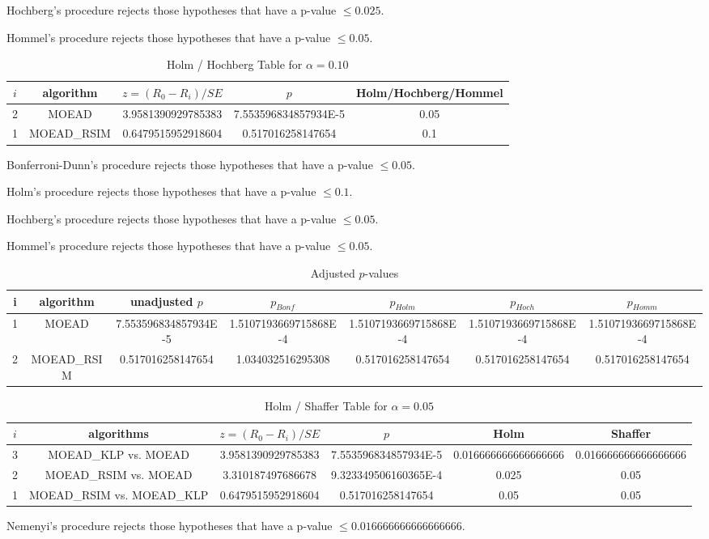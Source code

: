 \documentclass[a4paper,10pt]{article}
\begin{document}
\begin{landscape}
Hochberg's procedure rejects those hypotheses that have a p-value $\le0.025$.


Hommel's procedure rejects those hypotheses that have a p-value $\le0.05$.


\begin{table}[!htp]
\centering\tiny
\caption{Holm / Hochberg Table for $\alpha=0.10$}
\begin{tabular}{ccccc}
$i$&algorithm&$z=(R_0 - R_i)/SE$&$p$&Holm/Hochberg/Hommel\\
\hline
2&MOEAD&3.9581390929785383&7.553596834857934E-5&0.05\\
1&MOEAD_RSIM&0.6479515952918604&0.517016258147654&0.1\\
\hline
\end{tabular}
\end{table}
Bonferroni-Dunn's procedure rejects those hypotheses that have a p-value $\le0.05$.


Holm's procedure rejects those hypotheses that have a p-value $\le0.1$.


Hochberg's procedure rejects those hypotheses that have a p-value $\le0.05$.


Hommel's procedure rejects those hypotheses that have a p-value $\le0.05$.


\begin{table}[!htp]
\centering\tiny
\caption{Adjusted $p$-values}
\begin{tabular}{ccccccc}
i&algorithm&unadjusted $p$&$p_{Bonf}$&$p_{Holm}$&$p_{Hoch}$&$p_{Homm}$\\
\hline
1&MOEAD&7.553596834857934E-5&1.5107193669715868E-4&1.5107193669715868E-4&1.5107193669715868E-4&1.5107193669715868E-4\\
2&MOEAD_RSIM&0.517016258147654&1.034032516295308&0.517016258147654&0.517016258147654&0.517016258147654\\
\hline
\end{tabular}
\end{table}

\begin{table}[!htp]
\centering\tiny
\caption{Holm / Shaffer Table for $\alpha=0.05$}
\begin{tabular}{cccccc}
$i$&algorithms&$z=(R_0 - R_i)/SE$&$p$&Holm&Shaffer\\
\hline
3&MOEAD_KLP vs. MOEAD&3.9581390929785383&7.553596834857934E-5&0.016666666666666666&0.016666666666666666\\
2&MOEAD_RSIM vs. MOEAD&3.310187497686678&9.323349506160365E-4&0.025&0.05\\
1&MOEAD_RSIM vs. MOEAD_KLP&0.6479515952918604&0.517016258147654&0.05&0.05\\
\hline
\end{tabular}
\end{table}
Nemenyi's procedure rejects those hypotheses that have a p-value $\le0.016666666666666666$.



\end{landscape}
\end{document}
